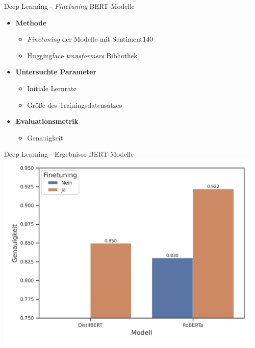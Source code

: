 \documentclass[aspectratio=169]{beamer}
\begin{document}
\begin{frame}{Deep Learning - \textit{Finetuning} BERT-Modelle}
	\begin{itemize}
		\item \textbf{Methode}
		      \begin{itemize}
			      \item \textit{Finetuning} der Modelle mit Sentiment140
			      \item Huggingface \textit{transformers} Bibliothek
		      \end{itemize}
		\item \textbf{Untersuchte Parameter}
		      \begin{itemize}
			      \item Initiale Lernrate
			      \item Größe des Trainingsdatensatzes
		      \end{itemize}
		\item \textbf{Evaluationsmetrik}
		      \begin{itemize}
			      \item Genauigkeit
		      \end{itemize}
	\end{itemize}
\end{frame}

\begin{frame}{Deep Learning - Ergebnisse BERT-Modelle}
	\centering
	\includegraphics[scale=0.65]{../datasets/sentiment140/results/plots/bert-based-genauigkeit-bert-basierte-modelle-default-vs.-finetuning-truncated-y-axis.png}
\end{frame}
\end{document}
